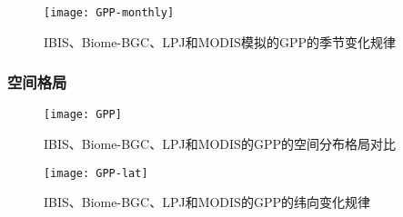 \begin{figure}[!htbp]
    \centering
    \texttt{[image: GPP-monthly]}
    \caption{IBIS、Biome-BGC、LPJ和MODIS模拟的GPP的季节变化规律}
    \label{fig:GPP-monthly}
\end{figure}


\subsubsection{空间格局}

\begin{figure}[!htbp]
    \centering
    \texttt{[image: GPP]}
    \caption{IBIS、Biome-BGC、LPJ和MODIS的GPP的空间分布格局对比}
    \label{fig:GPP}
\end{figure}

\begin{figure}[!htbp]
    \centering
    \texttt{[image: GPP-lat]}
    \caption{IBIS、Biome-BGC、LPJ和MODIS的GPP的纬向变化规律}
    \label{fig:GPP-lat}
\end{figure}